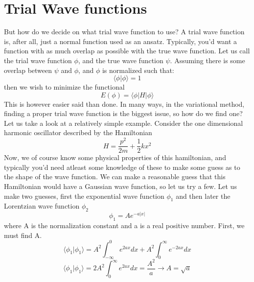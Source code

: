 \documentclass[12pt]{article}
\begin{document}
{\section{Trial Wave functions}
But how do we decide on what trial wave function to use? A trial wave function is, after all, just a normal function used as an ansatz. Typically, you'd want a function with as much overlap as possible with the true wave function. \newline
Let us call the trial wave function $\phi$, and the true wave function $\psi$. Assuming there is some overlap between $\psi$ and $\phi$, and $\phi$ is normalized such that:
\begin{equation*}
    \langle \phi | \phi \rangle = 1
\end{equation*}
then we wish to minimize the functional
\begin{equation*}
    E(\phi) = \langle \phi | H | \phi \rangle
\end{equation*}
This is however easier said than done. In many ways, in the variational method, finding a proper trial wave function is the biggest issue, so how do we find one?
\newline
Let us take a look at a relatively simple example. Consider the one dimensional harmonic oscillator described by the Hamiltonian
\begin{equation*}
    H = \frac{p^2}{2m} + \frac{1}{2} k x^2
\end{equation*}
Now, we of course know some physical properties of this hamiltonian, and typically you'd need atleast some knowledge of these to make some guess as to the shape of the wave function. \newline
We can make a reasonable guess that this Hamiltonian would have a Gaussian wave function, so let us try a few.
\newline
Let us make two guesses, first the exponential wave function $\phi_1$ and then later the Lorentzian wave function $\phi_2$ \cite{solveHO}
\begin{equation*}
    \phi_1 = A e^{-a |x|}
\end{equation*}
where A is the normalization constant and a is a real positive number.
\newline
First, we must find A.
\begin{equation*}
    \langle \phi_1 | \phi_1 \rangle = A^2 \int_{-\infty}^0 e^{2 a x} dx + A^2 \int_0^\infty e^{-2ax} dx
\end{equation*}
\begin{equation*}
    \langle \phi_1 | \phi_1\rangle = 2 A^2 \int_0^\infty e^{2 a x} dx = \frac{A^2}{a} \xrightarrow[]{} A = \sqrt{a}

\end{equation*}}
\end{document}
